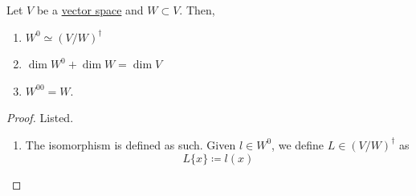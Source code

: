   \begin{theorem}
    \label{thm:annihilator-and-dual-quotient-space}
    Let $V$ be a \hyperref[def:vector-space]{vector space} and $W \subset V$. Then, 
    \begin{enumerate}
      \item $W^0 \simeq (V/W)^\dagger$
      \item $\dim W^0 + \dim W = \dim V$ 
      \item $W^{00} = W$. 
    \end{enumerate}
  \end{theorem}
  \begin{proof}
    Listed. 
    \begin{enumerate}
      \item The isomorphism is defined as such. Given $l \in W^0$, we define $L \in (V/W)^\dagger$ as 
        \begin{equation}
          L\{x\} \coloneqq l(x)
        \end{equation}
    \end{enumerate}
  \end{proof}

